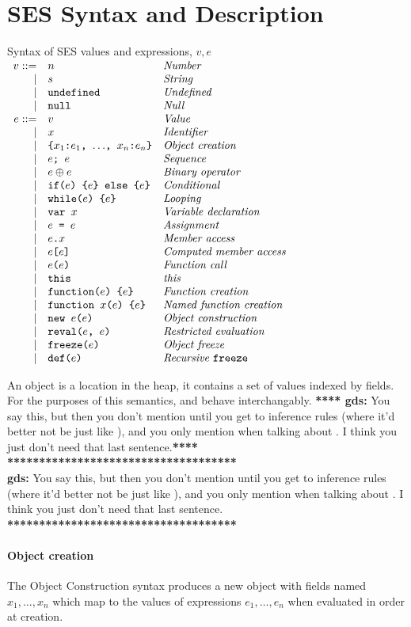 \documentclass[a4paper]{article}
\begin{document}
\section{SES Syntax and Description}

\newcommand{\gds}[1]{\ifmmode \textbf{**** gds: }\textrm{#1}\textbf{****}\else
  \textbf{\\************************************\\
    gds: }#1\\\textbf{************************************}
  \fi}

\newcommand{\syntaxline}[3][\pipe]{#1 & \js{#2} & \textit{#3}\\}
\begin{display}{Syntax of SES values and expressions, $v, e$}
  $\begin{array}{rll}
    \syntaxline[v ::=]{$n$}{Number}
    \syntaxline{$s$}{String}
    \syntaxline{undefined}{Undefined}
    \syntaxline{null}{Null}
    \syntaxline[e ::=]{$v$}{Value}
    \syntaxline{$x$}{Identifier}
    \syntaxline{\{$x_1$:$e_1$, $\ldots$, $x_n$:$e_n$\}}{Object creation}
    \syntaxline{$e$; $e$}{Sequence}
    \syntaxline{$e \oplus e$}{Binary operator}
    \syntaxline{if($e$) \{$e$\} else \{$e$\}}{Conditional}
    \syntaxline{while($e$) \{$e$\}}{Looping}
    \syntaxline{var $x$}{Variable declaration}
    \syntaxline{$e$ = $e$}{Assignment}
    \syntaxline{$e$.$x$}{Member access}
    \syntaxline{$e$[$e$]}{Computed member access}
    \syntaxline{$e$($e$)}{Function call}
    \syntaxline{this}{this}
    \syntaxline{function($e$) \{$e$\}}{Function creation}
    \syntaxline{function $x$($e$) \{$e$\}}{Named function creation}
    \syntaxline{new $e$($e$)}{Object construction}
    \syntaxline{reval($e$, $e$)}{Restricted evaluation}
    \syntaxline{freeze($e$)}{Object freeze}
    \syntaxline{def($e$)}{Recursive \js{freeze}}
  \end{array}$
\end{display}

An object is a location in the heap, it contains a set of
values indexed by fields.
For the purposes of this semantics,  and  behave
interchangably.
\gds{You say this, but then you don't mention \js{null} until you get to
  inference rules (where it'd better not be just like \js{undefined}), and you
  only mention \js{undefined} when talking about \js{this}. I think you just
  don't need that last sentence.}

\paragraph{Object creation}  The Object Construction syntax produces a new object
with fields named $x_1, \ldots, x_n$ which map to the values of expressions
$e_1, \ldots, e_n$ when evaluated in order at creation.
\end{document}
